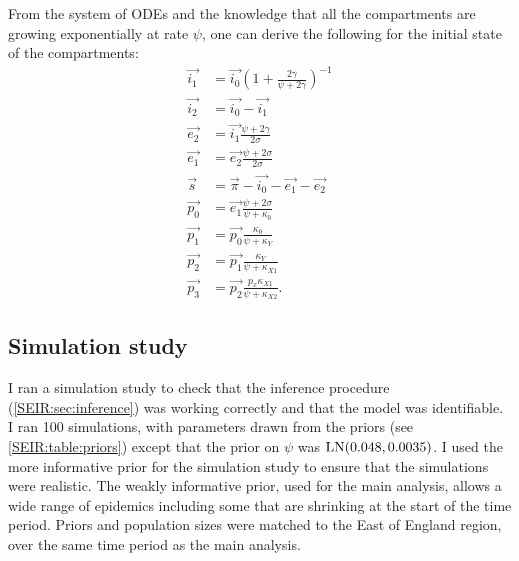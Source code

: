 \documentclass[thesis.tex]{subfiles}
\begin{document}
From the system of ODEs and the knowledge that all the compartments are growing exponentially at rate $\psi$, one can derive the following for the initial state of the compartments:
\begin{align}
    \vec{i_1} &= \vec{i_0} \left(1 + \frac{2\gamma}{\psi + 2\gamma} \right)^{-1} \\
    \vec{i_2} &= \vec{i_0} - \vec{i_1} \\
    \vec{e_2} &= \vec{i_1} \frac{\psi + 2\gamma}{2\sigma} \\
    \vec{e_1} &= \vec{e_2} \frac{\psi + 2\sigma}{2\sigma} \\
    \vec{s} &= \vec{\pi} - \vec{i_0} - \vec{e_1} - \vec{e_2} \\
    \vec{p_0} &= \vec{e_1} \frac{\psi + 2\sigma}{\psi + \kappa_0} \\
    \vec{p_1} &= \vec{p_0} \frac{\kappa_0}{\psi + \kappa_Y} \\
    \vec{p_2} &= \vec{p_1} \frac{\kappa_Y}{\psi + \kappa_{X1}} \\
    \vec{p_3} &= \vec{p_2} \frac{p_x \kappa_{X1}}{\psi + \kappa_{X2}}.
\end{align}

\subsection{Simulation study} \label{SEIR:sec:sim-study}

I ran a simulation study to check that the inference procedure (\cref{SEIR:sec:inference}) was working correctly and that the model was identifiable.
I ran 100 simulations, with parameters drawn from the priors (see \cref{SEIR:table:priors}) except that the prior on $\psi$ was $\operatorname{LN}(0.048, 0.0035)$.
I used the more informative prior for the simulation study to ensure that the simulations were realistic.
The weakly informative prior, used for the main analysis, allows a wide range of epidemics including some that are shrinking at the start of the time period.
Priors and population sizes were matched to the East of England region, over the same time period as the main analysis.
\end{document}
